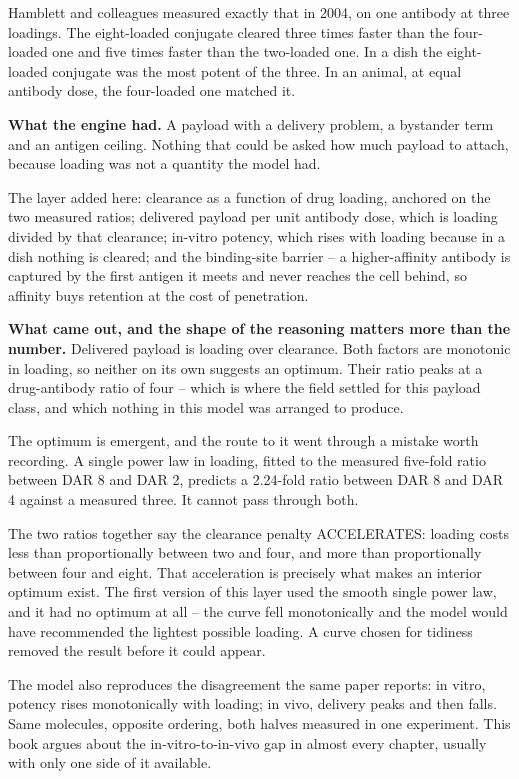 \documentclass[11pt,twoside,openright]{report}
\begin{document}
Hamblett and colleagues measured exactly that in 2004, on one antibody at three loadings. The eight-loaded conjugate cleared three times faster than the four-loaded one and five times faster than the two-loaded one. In a dish the eight-loaded conjugate was the most potent of the three. In an animal, at equal antibody dose, the four-loaded one matched it.

\textbf{What the engine had.} A payload with a delivery problem, a bystander term and an antigen ceiling. Nothing that could be asked how much payload to attach, because loading was not a quantity the model had.

\begin{numbers}
The layer added here: clearance as a function of drug loading, anchored on the two measured ratios; delivered payload per unit antibody dose, which is loading divided by that clearance; in-vitro potency, which rises with loading because in a dish nothing is cleared; and the binding-site barrier -- a higher-affinity antibody is captured by the first antigen it meets and never reaches the cell behind, so affinity buys retention at the cost of penetration.
\end{numbers}

\textbf{What came out, and the shape of the reasoning matters more than the number.} Delivered payload is loading over clearance. Both factors are monotonic in loading, so neither on its own suggests an optimum. Their ratio peaks at a drug-antibody ratio of four -- which is where the field settled for this payload class, and which nothing in this model was arranged to produce.

\begin{finding}
The optimum is emergent, and the route to it went through a mistake worth recording. A single power law in loading, fitted to the measured five-fold ratio between DAR 8 and DAR 2, predicts a 2.24-fold ratio between DAR 8 and DAR 4 against a measured three. It cannot pass through both.

The two ratios together say the clearance penalty ACCELERATES: loading costs less than proportionally between two and four, and more than proportionally between four and eight. That acceleration is precisely what makes an interior optimum exist. The first version of this layer used the smooth single power law, and it had no optimum at all -- the curve fell monotonically and the model would have recommended the lightest possible loading. A curve chosen for tidiness removed the result before it could appear.

The model also reproduces the disagreement the same paper reports: in vitro, potency rises monotonically with loading; in vivo, delivery peaks and then falls. Same molecules, opposite ordering, both halves measured in one experiment. This book argues about the in-vitro-to-in-vivo gap in almost every chapter, usually with only one side of it available.
\end{finding}
\end{document}
